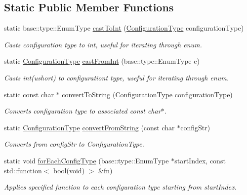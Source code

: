 \subsection*{Static Public Member Functions}
\begin{DoxyCompactItemize}
\item 
\hypertarget{classel_1_1ConfigurationTypeHelper_aa53161071fee3ce3f371ab90c62d5fc2}{static base\-::type\-::\-Enum\-Type \hyperlink{classel_1_1ConfigurationTypeHelper_aa53161071fee3ce3f371ab90c62d5fc2}{cast\-To\-Int} (\hyperlink{namespaceel_a281f5db6d6163678bc68a8b23b59e124}{Configuration\-Type} configuration\-Type)}\label{classel_1_1ConfigurationTypeHelper_aa53161071fee3ce3f371ab90c62d5fc2}

\begin{DoxyCompactList}\small\item\em Casts configuration type to int, useful for iterating through enum. \end{DoxyCompactList}\item 
\hypertarget{classel_1_1ConfigurationTypeHelper_a62301cbc966cf7e7e2a7b55cc3259996}{static \hyperlink{namespaceel_a281f5db6d6163678bc68a8b23b59e124}{Configuration\-Type} \hyperlink{classel_1_1ConfigurationTypeHelper_a62301cbc966cf7e7e2a7b55cc3259996}{cast\-From\-Int} (base\-::type\-::\-Enum\-Type c)}\label{classel_1_1ConfigurationTypeHelper_a62301cbc966cf7e7e2a7b55cc3259996}

\begin{DoxyCompactList}\small\item\em Casts int(ushort) to configurationt type, useful for iterating through enum. \end{DoxyCompactList}\item 
static const char $\ast$ \hyperlink{classel_1_1ConfigurationTypeHelper_ad7f0a19c416c4a8ddaf85330b141383c}{convert\-To\-String} (\hyperlink{namespaceel_a281f5db6d6163678bc68a8b23b59e124}{Configuration\-Type} configuration\-Type)
\begin{DoxyCompactList}\small\item\em Converts configuration type to associated const char$\ast$. \end{DoxyCompactList}\item 
static \hyperlink{namespaceel_a281f5db6d6163678bc68a8b23b59e124}{Configuration\-Type} \hyperlink{classel_1_1ConfigurationTypeHelper_af4a35305e3941fd578e55fec624eba43}{convert\-From\-String} (const char $\ast$config\-Str)
\begin{DoxyCompactList}\small\item\em Converts from config\-Str to Configuration\-Type. \end{DoxyCompactList}\item 
static void \hyperlink{classel_1_1ConfigurationTypeHelper_ae5817d3d96672b15e813ebda1c9610f9}{for\-Each\-Config\-Type} (base\-::type\-::\-Enum\-Type $\ast$start\-Index, const std\-::function$<$ bool(void) $>$ \&fn)
\begin{DoxyCompactList}\small\item\em Applies specified function to each configuration type starting from start\-Index. \end{DoxyCompactList}\end{DoxyCompactItemize}
